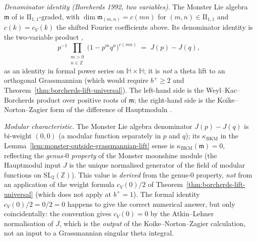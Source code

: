 \begin{remark}
\begin{enumerate}[label=\textup{(\arabic*)}]
 \emph{Denominator identity (Borcherds 1992, two variables).} The
 Monster Lie algebra $\mathfrak{m}$ of \cite{Borcherds1992} is
 $\mathrm{II}_{1,1}$-graded, with $\dim \mathfrak{m}_{(m,n)} = c(mn)$
 for $(m,n) \in \mathrm{II}_{1,1}$ and $c(k) = c_V(k)$ the shifted
 Fourier coefficients above. Its denominator identity is the
 two-variable product \cite[Thm.~10.1]{Borcherds1992},
 \[
 p^{-1} \prod_{\substack{m > 0 \\ n \in \mathbb{Z}}}
 \bigl(1 - p^m q^n\bigr)^{c(mn)}
 \;=\; J(p) - J(q),
 \]
 as an identity in formal power series on $\mathbb{H} \times
 \mathbb{H}$; it is \emph{not} a theta lift to an orthogonal
 Grassmannian (which would require $b^+ \ge 2$ and
 Theorem~\ref{thm:borcherds-lift-universal}). The left-hand side is
 the Weyl--Kac--Borcherds product over positive roots of
 $\mathfrak{m}$; the right-hand side is the Koike--Norton--Zagier
 form of the difference of Hauptmoduln
 \cite[\S8--10]{Borcherds1992}.

 \emph{Modular characteristic.} The Monster Lie algebra denominator
 $J(p) - J(q)$ is bi-weight $(0,0)$ (a modular function separately
 in $p$ and $q$); its $\kappa_{\mathrm{BKM}}$ in the
 Lemma~\ref{lem:monster-outside-grassmannian-lift} sense is
 $\kappa_{\mathrm{BKM}}(\mathfrak{m}) = 0$, reflecting the
 \emph{genus-$0$ property} of the Monster moonshine module (the
 Hauptmodul input $J$ is the unique normalised generator of the
 field of modular functions on $\mathrm{SL}_2(\mathbb{Z})$). This
 value is \emph{derived} from the genus-$0$ property, \emph{not}
 from an application of the weight formula $c_V(0)/2$ of
 Theorem~\ref{thm:borcherds-lift-universal} (which does not apply
 at $b^+ = 1$). The formal identity $c_V(0)/2 = 0/2 = 0$ happens
 to give the correct numerical answer, but only coincidentally: the
 convention gives $c_V(0) = 0$ by the Atkin--Lehner normalisation
 of $J$, which is the \emph{output} of the Koike--Norton--Zagier
 calculation, not an input to a Grassmannian singular theta
 integral.


\end{enumerate}
\end{remark}
